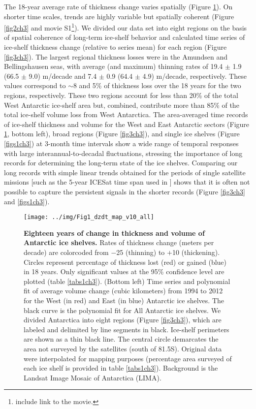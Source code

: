 The 18-year average rate of thickness change varies spatially (Figure \ref{fig1ch3}).
On shorter time scales, trends are highly variable but spatially coherent
(Figure \ref{fig2ch3} and movie S1\footnote{include link to the movie.}). We divided
our data set into eight regions on the basis of spatial coherence of long-term
ice-shelf behavior and calculated time series of ice-shelf thickness change
(relative to series mean) for each region (Figure \ref{fig3ch3}). The largest regional
thickness losses were in the Amundsen and Bellingshausen seas, with average
(and maximum) thinning rates of 19.4 $\pm$ 1.9 (66.5 $\pm$ 9.0) m/decade and
7.4 $\pm$ 0.9 (64.4 $\pm$ 4.9) m/decade, respectively. These values correspond
to $\sim$8 and 5\% of thickness loss over the 18 years for the two regions,
respectively. These two regions account for less than 20\% of the total West
Antarctic ice-shelf area but, combined, contribute more than 85\% of the total
ice-shelf volume loss from West Antarctica. The area-averaged time records of
ice-shelf thickness and volume for the West and East Antarctic sectors 
(Figure \ref{fig1ch3}, bottom left), broad regions (Figure \ref{fig3ch3}), and single ice
shelves (Figure \ref{figs1ch3}) at 3-month time intervals show a wide range of
temporal responses with large interannual-to-decadal fluctuations, stressing
the importance of long records for determining the long-term state of the ice
shelves. Comparing our long records with simple linear trends obtained for the
periods of single satellite missions [such as the 5-year ICESat time span used
in \textcite{Pritchard2012}] shows that it is often not possible to capture the
persistent signals in the shorter records (Figure \ref{fig3ch3} and \ref{figs1ch3}).


\begin{figure}[!ht]
  \texttt{[image: ../img/Fig1\_dzdt\_map\_v10\_all]}
  \caption{{\bf Eighteen years of change in thickness and volume of Antarctic
  ice shelves.} Rates of thickness change (meters per decade) are colorcoded
  from $-$25 (thinning) to $+$10 (thickening). Circles represent percentage of
  thickness lost (red) or gained (blue) in 18 years. Only significant values at
  the 95\% confidence level are plotted (table \ref{tabs1ch3}). (Bottom left)
  Time series and polynomial fit of average volume change (cubic kilometers)
  from 1994 to 2012 for the West (in red) and East (in blue) Antarctic ice
  shelves. The black curve is the polynomial fit for All Antarctic ice shelves.
  We divided Antarctica into eight regions (Figure \ref{fig3ch3}), which are labeled
  and delimited by line segments in black. Ice-shelf perimeters are shown as a
  thin black line. The central circle demarcates the area not surveyed by the
  satellites (south of 81.5\degree S). Original data were interpolated for
  mapping purposes (percentage area surveyed of each ice shelf is provided in
  table \ref{tabs1ch3}). Background is the Landsat Image Mosaic of Antarctica
  (LIMA).}
  \label{fig1ch3}
\end{figure}


